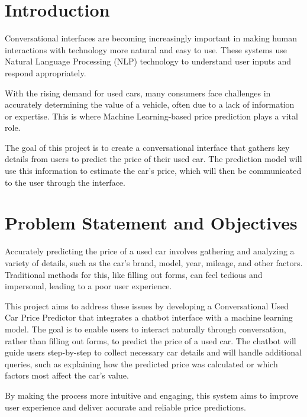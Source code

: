 \documentclass[a4paper,12pt]{article}
\begin{document}
\section{Introduction}
\begin{justify}
Conversational interfaces are becoming increasingly important in making human interactions with technology more natural and easy to use. These systems use Natural Language Processing (NLP) technology to understand user inputs and respond appropriately.

With the rising demand for used cars, many consumers face challenges in accurately determining the value of a vehicle, often due to a lack of information or expertise. This is where Machine Learning-based price prediction plays a vital role.

The goal of this project is to create a conversational interface that gathers key details from users to predict the price of their used car. The prediction model will use this information to estimate the car’s price, which will then be communicated to the user through the interface.
\newline
\end{justify}


\section{Problem Statement and Objectives}
\begin{justify}
Accurately predicting the price of a used car involves gathering and analyzing a variety of details, such as the car's brand, model, year, mileage, and other factors. Traditional methods for this, like filling out forms, can feel tedious and impersonal, leading to a poor user experience.

This project aims to address these issues by developing a Conversational Used Car Price Predictor that integrates a chatbot interface with a machine learning model. The goal is to enable users to interact naturally through conversation, rather than filling out forms, to predict the price of a used car. The chatbot will guide users step-by-step to collect necessary car details and will handle additional queries, such as explaining how the predicted price was calculated or which factors most affect the car's value.

By making the process more intuitive and engaging, this system aims to improve user experience and deliver accurate and reliable price predictions.
\end{justify}
\end{document}
